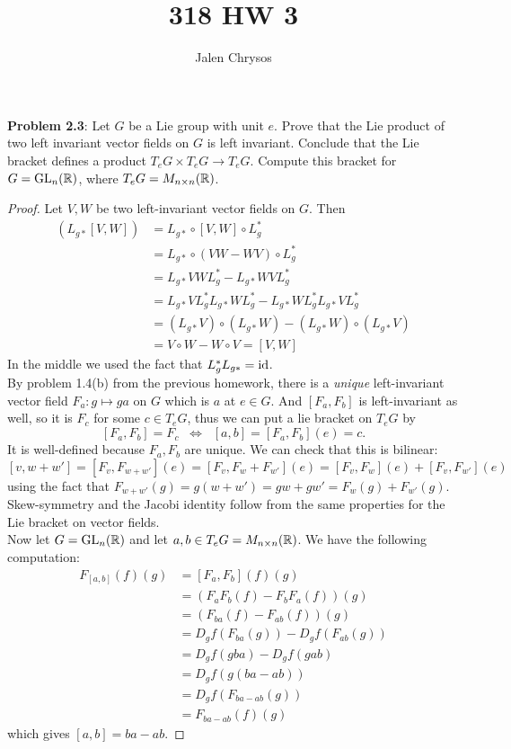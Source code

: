 \documentclass{amsart}
\title{318 HW 3}
\author{Jalen Chrysos}
\begin{document}
	
	\maketitle
	
	\textbf{Problem 2.3}: Let $G$ be a Lie group with unit $e$. Prove that the Lie product of two left invariant vector fields on $G$ is left invariant. Conclude that the Lie bracket defines a product $T_eG\times T_eG\to T_eG$. Compute this bracket for $G=\operatorname{GL}_n(\mathbb{R})$, where $T_eG=M_{n\times n}(\mathbb{R})$.
	\begin{proof}
		Let $V,W$ be two left-invariant vector fields on $G$. Then
		\begin{align*}
		(L_{g*}[V,W]) &= L_{g*}\circ [V,W]\circ L_{g}^*  \\
		&= L_{g*}\circ (VW-WV)\circ L_{g}^* \\
		&= L_{g*}VWL_g^* - L_{g*}WVL_g^*\\
		&= L_{g*}VL_g^*L_{g*}WL_g^* - L_{g*}WL_g^*L_{g*}VL_g^*\\
		&= (L_{g*}V)\circ (L_{g*}W) - (L_{g*}W)\circ (L_{g*}V)\\
		&= V\circ W - W\circ V = [V,W] 
		\end{align*}
		In the middle we used the fact that $L_{g}^*L_{g*} = \operatorname{id}$.\\
		
		By problem 1.4(b) from the previous homework, there is a \textit{unique} left-invariant vector field $F_a:g\mapsto ga$ on $G$ which is $a$ at $e\in G$. And $[F_a,F_b]$ is left-invariant as well, so it is $F_c$ for some $c\in T_eG$, thus we can put a lie bracket on $T_eG$ by
		$$
		[F_a,F_b] = F_c \; \; \iff \;\; [a,b] = [F_a,F_b](e) = c.
		$$ 
		It is well-defined because $F_a,F_b$ are unique. We can check that this is bilinear:
		$$
		[v,w+w'] = [F_v,F_{w+w'}](e) = [F_v,F_w + F_{w'}](e) =[F_v,F_w](e) +  [F_v,F_{w'}](e)
		$$
		using the fact that $F_{w+w'}(g)= g(w+w') = gw + gw' = F_w(g) + F_{w'}(g)$. 
		Skew-symmetry and the Jacobi identity follow from the same properties for the Lie bracket on vector fields.\\
		
		Now let $G=\operatorname{GL}_n(\mathbb{R})$ and let $a,b\in T_eG= M_{n\times n}(\mathbb{R})$. We have the following computation:
		\begin{align*}
		F_{[a,b]}(f)(g) &= [F_a,F_b](f)(g) \\
		&= (F_aF_b(f) - F_bF_a(f))(g)\\
		&= (F_{ba}(f) - F_{ab}(f))(g)\\
		&= D_gf(F_{ba}(g)) - D_gf(F_{ab}(g))\\
		&= D_gf(gba) - D_gf(gab)\\
		&= D_gf(g(ba-ab))\\
		&= D_gf(F_{ba-ab}(g))\\
		&= F_{ba-ab}(f)(g)
		\end{align*}
		which gives $[a,b]=ba-ab$.
	\end{proof} 
	
\end{document}
